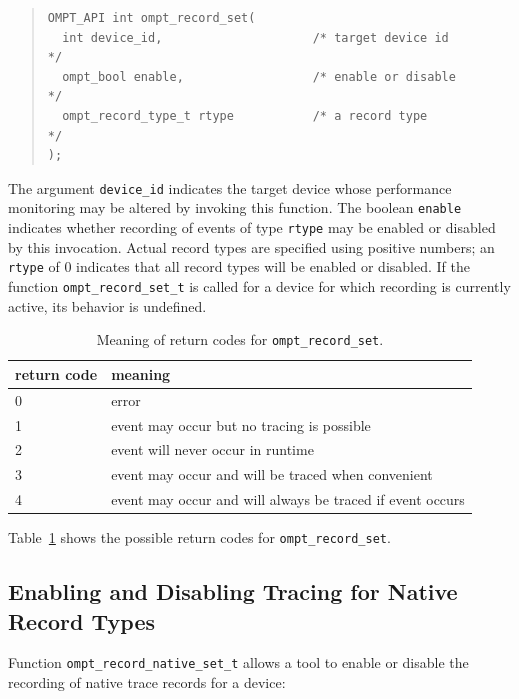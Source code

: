 \documentclass{article}
\begin{document}
\begin{quote}
\begin{verbatim}
OMPT_API int ompt_record_set(
  int device_id,                     /* target device id          */
  ompt_bool enable,                  /* enable or disable         */
  ompt_record_type_t rtype           /* a record type             */
);
\end{verbatim}
\end{quote}
The argument \verb|device_id| indicates the target device whose performance monitoring may be altered by invoking this function. The boolean \verb|enable| indicates whether recording of events of type \verb|rtype| may be enabled or disabled by this invocation.
Actual record types are specified using positive numbers; an \verb|rtype| of  0 indicates that all record types will be enabled or disabled.
If the function \verb|ompt_record_set_t| is called for a device for which recording is currently active, its behavior is undefined.

\begin{table}
\centering
\begin{tabular}{|l|l|}
\hline
return code & meaning \\\hline
0 & error\\\hline
1 & event may occur but no tracing is possible\\\hline
2 & event will never occur in runtime\\\hline
3 & event may occur and will be traced  when convenient\\\hline
4 & event may occur and will always be traced if event occurs\\\hline
\end{tabular}
\caption{Meaning of return codes for {\tt ompt\_record\_set}.}
\label{table:record_set}
\end{table}

Table~\ref{table:record_set} shows the possible return codes for \verb|ompt_record_set|.


\subsection{Enabling and Disabling Tracing for Native Record Types}
\label{sec:trace-event-native}
Function \verb|ompt_record_native_set_t| allows a tool to enable or disable the recording of native trace records for a device:
\end{document}
